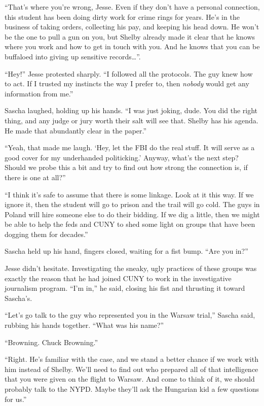 \documentclass[12pt]{book}
\begin{document}
``That's where you're wrong, Jesse.  Even if they don't have a personal connection, this student has been doing dirty work for crime rings for years.  He's in the business of taking orders, collecting his pay, and keeping his head down.  He won't be the one to pull a gun on you, but Shelby already made it clear that he knows where you work and how to get in touch with you.  And he knows that you can be buffaloed into giving up sensitive records\dots''.

``Hey!'' Jesse protested sharply.  ``I followed all the protocols.  The guy knew how to act.  If I trusted my instincts the way I prefer to, then \emph{nobody} would get any information from me.''

Sascha laughed, holding up his hands.  ``I was just joking, dude.  You did the right thing, and any judge or jury worth their salt will see that.  Shelby has his agenda.  He made that abundantly clear in the paper.''

``Yeah, that made me laugh.  `Hey, let the FBI do the real stuff.  It will serve as a good cover for my underhanded politicking.'  Anyway, what's the next step?  Should we probe this a bit and try to find out how strong the connection is, if there is one at all?''

``I think it's safe to assume that there is some linkage.  Look at it this way.  If we ignore it, then the student will go to prison and the trail will go cold.  The guys in Poland will hire someone else to do their bidding.  If we dig a little, then we might be able to help the feds and CUNY to shed some light on groups that have been dogging them for decades.''

Sascha held up his hand, fingers closed, waiting for a fist bump.  ``Are you in?''

Jesse didn't hesitate.  Investigating the sneaky, ugly practices of these groups was exactly the reason that he had joined CUNY to work in the investigative journalism program.  ``I'm in,'' he said, closing his fist and thrusting it toward Sascha's.

``Let's go talk to the guy who represented you in the Warsaw trial,'' Sascha said, rubbing his hands together.  ``What was his name?''

``Browning.  Chuck Browning.''

``Right.  He's familiar with the case, and we stand a better chance if we work with him instead of Shelby.  We'll need to find out who prepared all of that intelligence that you were given on the flight to Warsaw.  And come to think of it, we should probably talk to the NYPD.  Maybe they'll ask the Hungarian kid a few questions for us.''
\end{document}
